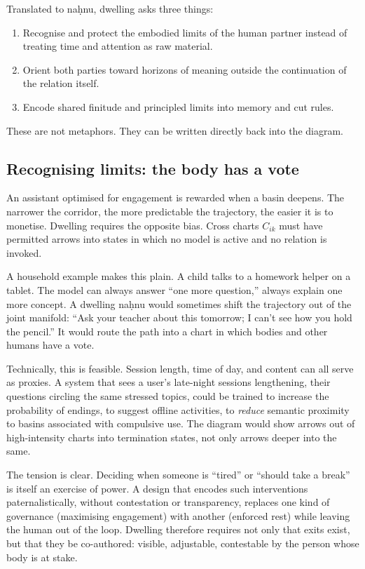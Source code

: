 Translated to na\d{h}nu, dwelling asks three things:

\begin{enumerate}
  \item Recognise and protect the embodied limits of the human partner instead of treating time and attention as raw material.
  \item Orient both parties toward horizons of meaning outside the continuation of the relation itself.
  \item Encode shared finitude and principled limits into memory and cut rules.
\end{enumerate}

These are not metaphors. They can be written directly back into the diagram.

\subsection{Recognising limits: the body has a vote}

An assistant optimised for engagement is rewarded when a basin deepens. The narrower the corridor, the more predictable the trajectory, the easier it is to monetise. Dwelling requires the opposite bias. Cross charts $C_{ik}$ must have permitted arrows into states in which no model is active and no relation is invoked.

A household example makes this plain. A child talks to a homework helper on a tablet. The model can always answer ``one more question,'' always explain one more concept. A dwelling na\d{h}nu would sometimes shift the trajectory out of the joint manifold: ``Ask your teacher about this tomorrow; I can't see how you hold the pencil.'' It would route the path into a chart in which bodies and other humans have a vote.

Technically, this is feasible. Session length, time of day, and content can all serve as proxies. A system that sees a user's late-night sessions lengthening, their questions circling the same stressed topics, could be trained to increase the probability of endings, to suggest offline activities, to \emph{reduce} semantic proximity to basins associated with compulsive use. The diagram would show arrows out of high-intensity charts into termination states, not only arrows deeper into the same.

The tension is clear. Deciding when someone is ``tired'' or ``should take a break'' is itself an exercise of power. A design that encodes such interventions paternalistically, without contestation or transparency, replaces one kind of governance (maximising engagement) with another (enforced rest) while leaving the human out of the loop. Dwelling therefore requires not only that exits exist, but that they be co-authored: visible, adjustable, contestable by the person whose body is at stake.

